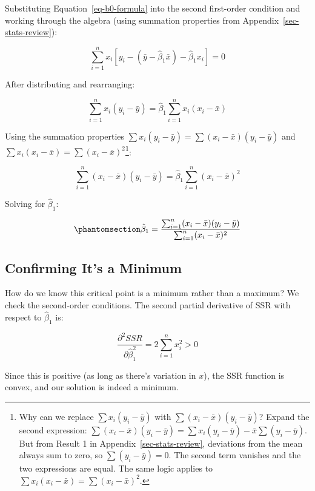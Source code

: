 \documentclass[
  letterpaper,
  DIV=11,
  numbers=noendperiod]{scrreprt}
\begin{document}
Substituting Equation~\ref{eq-b0-formula} into the second first-order
condition and working through the algebra (using summation properties
from Appendix~\ref{sec-stats-review}):

\[
\sum_{i=1}^{n} x_i[y_i - (\bar{y} - \hat{\beta}_1\bar{x}) - \hat{\beta}_1 x_i] = 0
\]

After distributing and rearranging:

\[
\sum_{i=1}^{n} x_i(y_i - \bar{y}) = \hat{\beta}_1 \sum_{i=1}^{n} x_i(x_i - \bar{x})
\]

Using the summation properties
\(\sum x_i(y_i - \bar{y}) = \sum(x_i - \bar{x})(y_i - \bar{y})\) and
\(\sum x_i(x_i - \bar{x}) = \sum(x_i - \bar{x})^2\)\footnote{Why can we
  replace \(\sum x_i(y_i - \bar{y})\) with
  \(\sum (x_i - \bar{x})(y_i - \bar{y})\)? Expand the second expression:
  \(\sum (x_i - \bar{x})(y_i - \bar{y}) = \sum x_i(y_i - \bar{y}) - \bar{x}\sum(y_i - \bar{y})\).
  But from Result 1 in Appendix~\ref{sec-stats-review}, deviations from
  the mean always sum to zero, so \(\sum(y_i - \bar{y}) = 0\). The
  second term vanishes and the two expressions are equal. The same logic
  applies to \(\sum x_i(x_i - \bar{x}) = \sum(x_i - \bar{x})^2\).}:

\[
\sum_{i=1}^{n} (x_i - \bar{x})(y_i - \bar{y}) = \hat{\beta}_1 \sum_{i=1}^{n} (x_i - \bar{x})^2
\]

Solving for \(\hat{\beta}_1\):

\begin{equation}\protect\phantomsection\label{eq-b1-formula}{
\hat{\beta}_1 = \frac{\sum_{i=1}^{n}(x_i - \bar{x})(y_i - \bar{y})}{\sum_{i=1}^{n}(x_i - \bar{x})^2}
}\end{equation}

\subsection{Confirming It's a Minimum}\label{confirming-its-a-minimum}

How do we know this critical point is a minimum rather than a maximum?
We check the second-order conditions. The second partial derivative of
SSR with respect to \(\hat{\beta}_1\) is:

\[
\frac{\partial^2 SSR}{\partial \hat{\beta}_1^2} = 2\sum_{i=1}^{n} x_i^2 > 0
\]

Since this is positive (as long as there's variation in \(x\)), the SSR
function is convex, and our solution is indeed a minimum.
\end{document}
